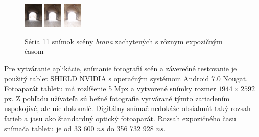 \begin{figure}[t]
	\includegraphics[width=0.08\textwidth]{figures/capturing/series/s8}
	\includegraphics[width=0.08\textwidth]{figures/capturing/series/s9}
	\includegraphics[width=0.08\textwidth]{figures/capturing/series/s10}
  \caption{Séria 11 snímok scény \textit{brana} zachytených s rôznym expozičným časom}
  \label{fig:BranaSeries}
\end{figure}

Pre vytváranie aplikácie, snímanie fotografií scén a záverečné testovanie je použitý tablet SHIELD NVIDIA s operačným
systémom Android 7.0 Nougat. Fotoaparát tabletu má rozlíšenie 5 Mpx a vytvorené snímky rozmer $1944\times2592$ px.
Z pohľadu užívateľa sú bežné fotografie vytvárané týmto zariadením uspokojivé, ale nie dokonalé. Digitálny snímač
nedokáže obsiahnúť taký rozsah farieb a jasu ako štandardný optický fotoaparát. Rozsah expozičného času snímača
tabletu je od 33 600 $ns$ do 356 732 928 $ns$.
